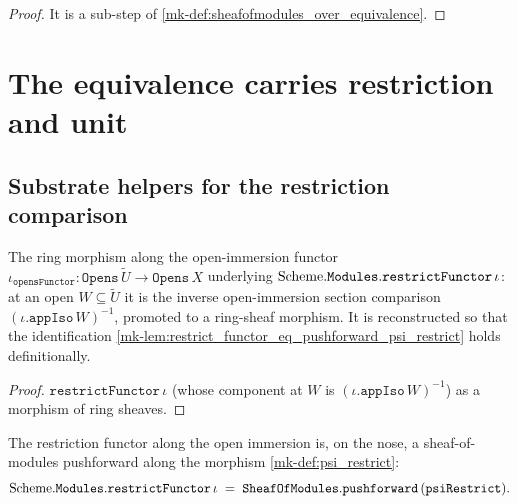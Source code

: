 \begin{proof}
  \leanok
 It is a sub-step of
  \ref{mk-def:sheafofmodules_over_equivalence}.
\end{proof}

\section{The equivalence carries restriction and unit}
\label{mk-sec:soe_consumers}

\subsection{Substrate helpers for the restriction comparison}
\label{mk-sec:soe_consumers_helpers}

\begin{definition}\label{mk-def:psi_restrict}
  \leanok

  The ring morphism along the open-immersion functor
  \(\iota_{\mathtt{opensFunctor}} : \mathtt{Opens}\,\widetilde{U} \to
  \mathtt{Opens}\,X\) underlying \(\mathrm{Scheme}.\mathtt{Modules.restrictFunctor}\,\iota\):
  at an open \(W \subseteq \widetilde{U}\) it is the inverse open-immersion section
  comparison \((\iota.\mathtt{appIso}\,W)^{-1}\), promoted to a ring-sheaf morphism.
  It is reconstructed so that the identification
  \ref{mk-lem:restrict_functor_eq_pushforward_psi_restrict} holds definitionally.
\end{definition}

\begin{proof}
  \leanok
  \(\mathtt{restrictFunctor}\,\iota\) (whose component at \(W\) is
  \((\iota.\mathtt{appIso}\,W)^{-1}\)) as a morphism of ring sheaves.
\end{proof}

\begin{lemma}\label{mk-lem:restrict_functor_eq_pushforward_psi_restrict}
  \leanok

  The restriction functor along the open immersion is, on the nose, a sheaf-of-modules
  pushforward along the morphism \ref{mk-def:psi_restrict}:
  \[
    \mathrm{Scheme}.\mathtt{Modules.restrictFunctor}\,\iota
      \;=\; \mathtt{SheafOfModules.pushforward}\,(\mathtt{psiRestrict}).
  \]
\end{lemma}

